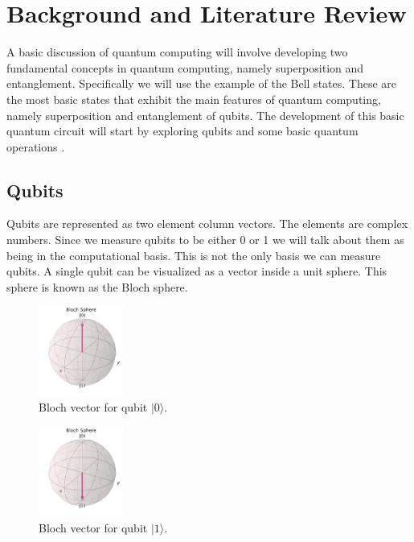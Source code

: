 \documentclass{article}
\newcommand{\ket}[1]{{\lvert #1 \rangle}}
\begin{document}
\section{Background and Literature Review}

A basic discussion of quantum computing will involve developing two fundamental concepts in quantum computing, namely superposition and entanglement.
Specifically we will use the example of the Bell states. These are the most basic states that exhibit the main features of quantum computing, namely superposition and entanglement of qubits. The development of this basic quantum circuit will start by exploring qubits and some basic quantum operations \cite{b1, b2}.  

\subsection{Qubits}

Qubits are represented as two element column vectors. The elements are complex numbers. Since we measure qubits to be either 0 or 1 we will talk about them as being in the computational basis. This is not the only basis we can measure qubits. A single qubit can be visualized as a vector inside a unit sphere. This sphere is known as the Bloch sphere. 

\begin{figure}[H]
    \centering
    \includegraphics[width=0.25\textwidth]{bloch0.png}
    \caption{Bloch vector for qubit $\ket{0}$.}
    \label{fig:bloch0}
\end{figure}

\begin{figure}[H]
    \centering
    \includegraphics[width=0.25\textwidth]{bloch1.png}
    \caption{Bloch vector for qubit $\ket{1}$.}
    \label{fig:bloch1}
\end{figure}
\end{document}
